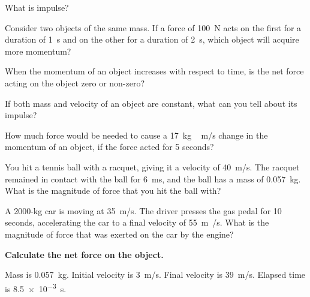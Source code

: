 \documentclass[main.tex]{subfiles}
\begin{document}
\begin{exercise}
    What is impulse?
\end{exercise}

\begin{exercise} \label{6HJcp6}
    Consider two objects of the same mass. If a force of \SI{100}{N}  acts on the first for a duration of \SI{1}{s}  and on the other for a duration of \SI{2}{s}, which object will acquire more momentum?
\end{exercise}

\begin{exercise}
    When the momentum of an object increases with respect to time, is the net force acting on the object zero or non-zero?
\end{exercise}

\begin{exercise} \label{ukvCcg}
    If both mass and velocity of an object are constant, what can you tell about its impulse?
\end{exercise}

\begin{exercise} \label{dAVKAB}
    How much force would be needed to cause a \SI{17}{kg\,m/s} change in the momentum of an object, if the force acted for 5 seconds?
\end{exercise}

\begin{exercise} \label{R5mamD}
    You hit a tennis ball with a racquet, giving it a velocity of \SI{40}{m/s}. The racquet remained in contact with the ball for \SI{6}{ms}, and the ball has a mass of \SI{0.057}{kg}. What is the magnitude of force that you hit the ball with?
\end{exercise}

\begin{exercise} \label{rVq3Tj}
    A 2000-kg car is moving at \SI{35}{m/s}. The driver presses the gas pedal for 10 seconds, accelerating the car to a final velocity of \SI{55}{m/}s. What is the magnitude of force that was exerted on the car by the engine?
\end{exercise}

\cyanhrule

\vspace{1em}

\textbf{Calculate the net force on the object.}

\begin{exercise} \label{4Me32D}
    Mass is \SI{0.057}{kg}. Initial velocity is \SI{3}{m/s}. Final velocity is \SI{39}{m/s}. Elapsed time is \SI{8.5e-3}{s}.
\end{exercise}
\end{document}
